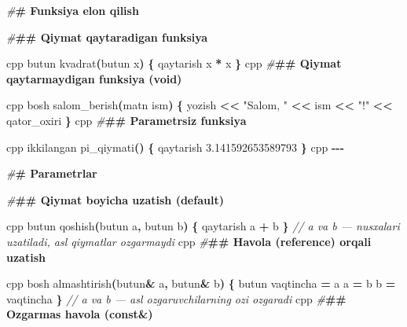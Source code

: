 \documentclass[a4paper,11pt,twoside,openright]{book}
\newenvironment{Shaded}{\begin{snugshade}}{\end{snugshade}}
\newcommand{\CommentTok}[1]{\textcolor[rgb]{0.56,0.35,0.01}{\textit{#1}}}
\newcommand{\ErrorTok}[1]{\textcolor[rgb]{0.64,0.00,0.00}{\textbf{#1}}}
\newcommand{\FloatTok}[1]{\textcolor[rgb]{0.00,0.00,0.81}{#1}}
\newcommand{\NormalTok}[1]{#1}
\newcommand{\OperatorTok}[1]{\textcolor[rgb]{0.81,0.36,0.00}{\textbf{#1}}}
\newcommand{\PreprocessorTok}[1]{\textcolor[rgb]{0.56,0.35,0.01}{\textit{#1}}}
\newcommand{\StringTok}[1]{\textcolor[rgb]{0.31,0.60,0.02}{#1}}
\begin{document}
\begin{Shaded}
\begin{Highlighting}[]
\PreprocessorTok{\#}\ErrorTok{\# Funksiya e\textquotesingle{}lon qilish}

\PreprocessorTok{\#}\ErrorTok{\#\# Qiymat qaytaradigan funksiya}

\ErrorTok{\textasciigrave{}\textasciigrave{}\textasciigrave{}}\NormalTok{cpp}
\NormalTok{butun kvadrat}\OperatorTok{(}\NormalTok{butun x}\OperatorTok{)} \OperatorTok{\{}
\NormalTok{    qaytarish x }\OperatorTok{*}\NormalTok{ x}
\OperatorTok{\}}
\ErrorTok{\textasciigrave{}\textasciigrave{}\textasciigrave{}}\NormalTok{cpp}
\PreprocessorTok{\#}\ErrorTok{\#\# Qiymat qaytarmaydigan funksiya (void)}

\ErrorTok{\textasciigrave{}\textasciigrave{}\textasciigrave{}}\NormalTok{cpp}
\NormalTok{bosh salom\_berish}\OperatorTok{(}\NormalTok{matn ism}\OperatorTok{)} \OperatorTok{\{}
\NormalTok{    yozish }\OperatorTok{\textless{}\textless{}} \StringTok{"Salom, "} \OperatorTok{\textless{}\textless{}}\NormalTok{ ism }\OperatorTok{\textless{}\textless{}} \StringTok{"!"} \OperatorTok{\textless{}\textless{}}\NormalTok{ qator\_oxiri}
\OperatorTok{\}}
\ErrorTok{\textasciigrave{}\textasciigrave{}\textasciigrave{}}\NormalTok{cpp}
\PreprocessorTok{\#}\ErrorTok{\#\# Parametrsiz funksiya}

\ErrorTok{\textasciigrave{}\textasciigrave{}\textasciigrave{}}\NormalTok{cpp}
\NormalTok{ikkilangan pi\_qiymati}\OperatorTok{()} \OperatorTok{\{}
\NormalTok{    qaytarish }\FloatTok{3.141592653589793}
\OperatorTok{\}}
\ErrorTok{\textasciigrave{}\textasciigrave{}\textasciigrave{}}\NormalTok{cpp}
\OperatorTok{{-}{-}{-}}

\PreprocessorTok{\#}\ErrorTok{\# Parametrlar}

\PreprocessorTok{\#}\ErrorTok{\#\# Qiymat bo\textquotesingle{}yicha uzatish (default)}

\ErrorTok{\textasciigrave{}\textasciigrave{}\textasciigrave{}}\NormalTok{cpp}
\NormalTok{butun qoshish}\OperatorTok{(}\NormalTok{butun a}\OperatorTok{,}\NormalTok{ butun b}\OperatorTok{)} \OperatorTok{\{}
\NormalTok{    qaytarish a }\OperatorTok{+}\NormalTok{ b}
\OperatorTok{\}}
\CommentTok{// a va b — nusxalari uzatiladi, asl qiymatlar o\textquotesingle{}zgarmaydi}
\ErrorTok{\textasciigrave{}\textasciigrave{}\textasciigrave{}}\NormalTok{cpp}
\PreprocessorTok{\#}\ErrorTok{\#\# Havola (reference) orqali uzatish}

\ErrorTok{\textasciigrave{}\textasciigrave{}\textasciigrave{}}\NormalTok{cpp}
\NormalTok{bosh almashtirish}\OperatorTok{(}\NormalTok{butun}\OperatorTok{\&}\NormalTok{ a}\OperatorTok{,}\NormalTok{ butun}\OperatorTok{\&}\NormalTok{ b}\OperatorTok{)} \OperatorTok{\{}
\NormalTok{    butun vaqtincha }\OperatorTok{=}\NormalTok{ a}
\NormalTok{    a }\OperatorTok{=}\NormalTok{ b}
\NormalTok{    b }\OperatorTok{=}\NormalTok{ vaqtincha}
\OperatorTok{\}}
\CommentTok{// a va b — asl o\textquotesingle{}zgaruvchilarning o\textquotesingle{}zi o\textquotesingle{}zgaradi}
\ErrorTok{\textasciigrave{}\textasciigrave{}\textasciigrave{}}\NormalTok{cpp}
\PreprocessorTok{\#}\ErrorTok{\#\# O\textquotesingle{}zgarmas havola (\textasciigrave{}const\&\textasciigrave{})}


\end{Highlighting}
\end{Shaded}
\end{document}
